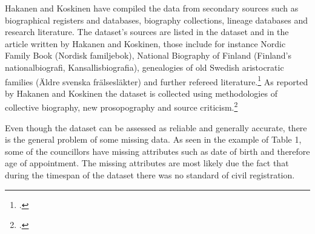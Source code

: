 \documentclass[a4paper,12pt]{article}
\begin{document}
\begin{onehalfspace}
\begin{table}[h]
	\centering
	\caption{Example rows of the dataset: Gyllenhorn, Joen Olsson and Natt och Dag, Måns Johansson (\cite{councillorsDS})} 
\end{table}
 
Hakanen and Koskinen have compiled the data from secondary sources such as biographical registers and databases, biography collections, lineage databases and research literature. The dataset's sources are listed in the dataset and in the article written by Hakanen and Koskinen, those include for instance Nordic Family Book (Nordisk familjebok), National Biography of Finland (Finland's nationalbiografi, Kansallisbiografia), genealogies of old Swedish aristocratic families (Äldre svenska frälsesläkter) and further refereed literature.\footcites[p. 48, 76]{HakanenAKoskinen2017}{councillorsDS} As reported by Hakanen and Koskinen the dataset is collected using methodologies of collective biography, new prosopography and source criticism.\footcite[p. 48.]{HakanenAKoskinen2017}
  
Even though the dataset can be assessed as reliable and generally accurate, there is the general problem of some missing data. As seen in the example of Table 1, some of the councillors have missing attributes such as date of birth and therefore age of appointment. The missing attributes are most likely due the fact that during the timespan of the dataset there was no standard of civil registration. 


\end{onehalfspace}
\end{document}
